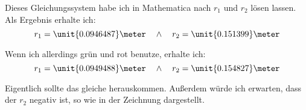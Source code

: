 \documentclass[11pt, ngerman, fleqn]{article}
\begin{document}
Dieses Gleichungssystem habe ich in Mathematica nach $r_1$ und $r_2$ lösen lassen. Als Ergebnis erhalte ich:
\[
	r_1 = \unit{0.0946487}\meter
	\quad\wedge\quad
	r_2 = \unit{0.151399}\meter
\]

Wenn ich allerdings grün und rot benutze, erhalte ich:
\[
	r_1 = \unit{0.0949488}\meter
	\quad\wedge\quad
	r_2 = \unit{0.154827}\meter
\]

Eigentlich sollte das gleiche herauskommen. Außerdem würde ich erwarten, dass
der $r_2$ negativ ist, so wie in der Zeichnung dargestellt.

%
%
\end{document}
